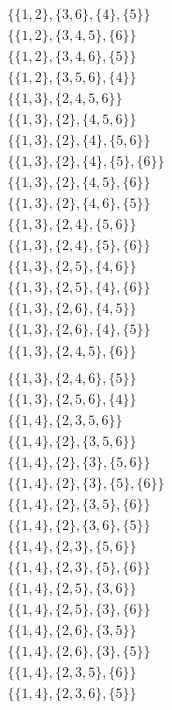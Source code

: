 \documentclass[11pt]{article}
\begin{document}
\begin{flushleft}
\begin{align*}
\{\{1, 2\}, \{3, 6\}, \{4\}, \{5\}\}\\
\{\{1, 2\}, \{3, 4, 5\}, \{6\}\}\\
\{\{1, 2\}, \{3, 4, 6\}, \{5\}\}\\
\{\{1, 2\}, \{3, 5, 6\}, \{4\}\}\\
\{\{1, 3\}, \{2, 4, 5, 6\}\}\\
\{\{1, 3\}, \{2\}, \{4, 5, 6\}\}\\
\{\{1, 3\}, \{2\}, \{4\}, \{5, 6\}\}\\
\{\{1, 3\}, \{2\}, \{4\}, \{5\}, \{6\}\}\\
\{\{1, 3\}, \{2\}, \{4, 5\}, \{6\}\}\\
\{\{1, 3\}, \{2\}, \{4, 6\}, \{5\}\}\\
\{\{1, 3\}, \{2, 4\}, \{5, 6\}\}\\
\{\{1, 3\}, \{2, 4\}, \{5\}, \{6\}\}\\
\{\{1, 3\}, \{2, 5\}, \{4, 6\}\}\\
\{\{1, 3\}, \{2, 5\}, \{4\}, \{6\}\}\\
\{\{1, 3\}, \{2, 6\}, \{4, 5\}\}\\
\{\{1, 3\}, \{2, 6\}, \{4\}, \{5\}\}\\
\{\{1, 3\}, \{2, 4, 5\}, \{6\}\}\\
\end{align*}
\begin{align*}
\{\{1, 3\}, \{2, 4, 6\}, \{5\}\}\\
\{\{1, 3\}, \{2, 5, 6\}, \{4\}\}\\
\{\{1, 4\}, \{2, 3, 5, 6\}\}\\
\{\{1, 4\}, \{2\}, \{3, 5, 6\}\}\\
\{\{1, 4\}, \{2\}, \{3\}, \{5, 6\}\}\\
\{\{1, 4\}, \{2\}, \{3\}, \{5\}, \{6\}\}\\
\{\{1, 4\}, \{2\}, \{3, 5\}, \{6\}\}\\
\{\{1, 4\}, \{2\}, \{3, 6\}, \{5\}\}\\
\{\{1, 4\}, \{2, 3\}, \{5, 6\}\}\\
\{\{1, 4\}, \{2, 3\}, \{5\}, \{6\}\}\\
\{\{1, 4\}, \{2, 5\}, \{3, 6\}\}\\
\{\{1, 4\}, \{2, 5\}, \{3\}, \{6\}\}\\
\{\{1, 4\}, \{2, 6\}, \{3, 5\}\}\\
\{\{1, 4\}, \{2, 6\}, \{3\}, \{5\}\}\\
\{\{1, 4\}, \{2, 3, 5\}, \{6\}\}\\
\{\{1, 4\}, \{2, 3, 6\}, \{5\}\}\\

\end{align*}
\end{flushleft}
\end{document}
